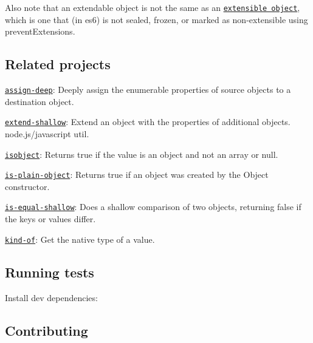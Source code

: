 Also note that an {\ttfamily extendable} object is not the same as an \href{https://developer.mozilla.org/en-US/docs/Web/JavaScript/Reference/Global_Objects/Object/isExtensible}{\tt extensible object}, which is one that (in es6) is not sealed, frozen, or marked as non-\/extensible using {\ttfamily prevent\+Extensions}.

\subsection*{Related projects}


\begin{DoxyItemize}
\item \href{https://github.com/jonschlinkert/assign-deep}{\tt assign-\/deep}\+: Deeply assign the enumerable properties of source objects to a destination object.
\item \href{https://github.com/jonschlinkert/extend-shallow}{\tt extend-\/shallow}\+: Extend an object with the properties of additional objects. node.\+js/javascript util.
\item \href{https://github.com/jonschlinkert/isobject}{\tt isobject}\+: Returns true if the value is an object and not an array or null.
\item \href{https://github.com/jonschlinkert/is-plain-object}{\tt is-\/plain-\/object}\+: Returns true if an object was created by the {\ttfamily Object} constructor.
\item \href{https://github.com/jonschlinkert/is-equal-shallow}{\tt is-\/equal-\/shallow}\+: Does a shallow comparison of two objects, returning false if the keys or values differ.
\item \href{https://github.com/jonschlinkert/kind-of}{\tt kind-\/of}\+: Get the native type of a value.
\end{DoxyItemize}

\subsection*{Running tests}

Install dev dependencies\+:




\subsection*{Contributing}


